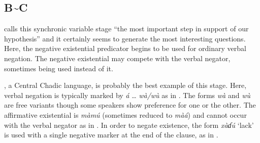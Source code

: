 \documentclass[output=paper]{langsci/langscibook}
\begin{document}
\subsection{B{\textasciitilde}C}\label{sec:3:3.4}
\citet[9]{Croft1991} calls this synchronic variable stage ``the most important step in support of our hypothesis'' and it certainly seems to generate the most interesting questions. Here, the negative existential predicator begins to be used for ordinary verbal negation. The negative existential may compete with the verbal negator, sometimes being used instead of it. 

, a Central Chadic language, is probably the best example of this
stage. Here, verbal negation is typically marked by \textit{\'a} \ldots{}
\textit{w\`a/w\`u} as in . The forms \textit{w\`a} and
\textit{w\`u} are free variants though some speakers show preference for
one or the other. The affirmative existential is \textit{m\`am\'u}
(sometimes reduced to \textit{m\`a\'a}) and cannot occur with the verbal
negator as in .  In order to negate existence, the
form \textit{x\`aɗ\'u} `lack' is used with a single negative marker at the
end of the clause, as in .
  
\end{document}
